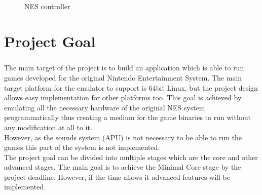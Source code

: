 \documentclass[]{report}
\begin{document}
\begin{figure}[!htb]
	\caption{\label{fig:my-label} NES controller}
\end{figure}



\chapter{Project Goal}
\paragraph{ }
The main target of the project is to build an application which is able to run games developed for the original Nintendo Entertainment System. The main target platform for the emulator to support is 64bit Linux, but the project design allows easy implementation for other platforms too. This goal is achieved by emulating all the necessary hardware of the original NES system programmatically thus creating a medium for the game binaries to run without any modification at all to it. 
\\ 
However, as the sounds system (APU) is not necessary to be able to run the games this part of the system is not implemented.
\\
The project goal can be divided into multiple stages which are the core and other advanced stages.
The main goal is to achieve the Minimal Core stage by the project deadline. However, if the time allows it advanced features will be implemented. 
\end{document}
